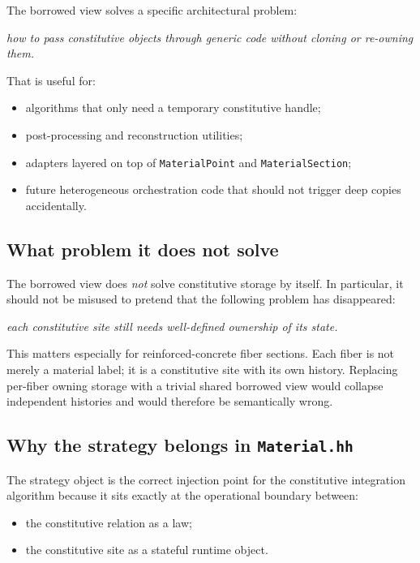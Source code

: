 The borrowed view solves a specific architectural problem:
\begin{center}
\emph{how to pass constitutive objects through generic code without cloning or
re-owning them.}
\end{center}

That is useful for:
\begin{itemize}
  \item algorithms that only need a temporary constitutive handle;
  \item post-processing and reconstruction utilities;
  \item adapters layered on top of \texttt{MaterialPoint} and
        \texttt{MaterialSection};
  \item future heterogeneous orchestration code that should not trigger deep
        copies accidentally.
\end{itemize}

\subsection{What problem it does not solve}

The borrowed view does \emph{not} solve constitutive storage by itself.  In
particular, it should not be misused to pretend that the following problem has
disappeared:
\begin{center}
\emph{each constitutive site still needs well-defined ownership of its state.}
\end{center}

This matters especially for reinforced-concrete fiber sections.  Each fiber is
not merely a material label; it is a constitutive site with its own history.
Replacing per-fiber owning storage with a trivial shared borrowed view would
collapse independent histories and would therefore be semantically wrong.

\subsection{Why the strategy belongs in \texttt{Material.hh}}

The strategy object is the correct injection point for the constitutive
integration algorithm because it sits exactly at the operational boundary
between:
\begin{itemize}
  \item the constitutive relation as a law;
  \item the constitutive site as a stateful runtime object.
\end{itemize}

